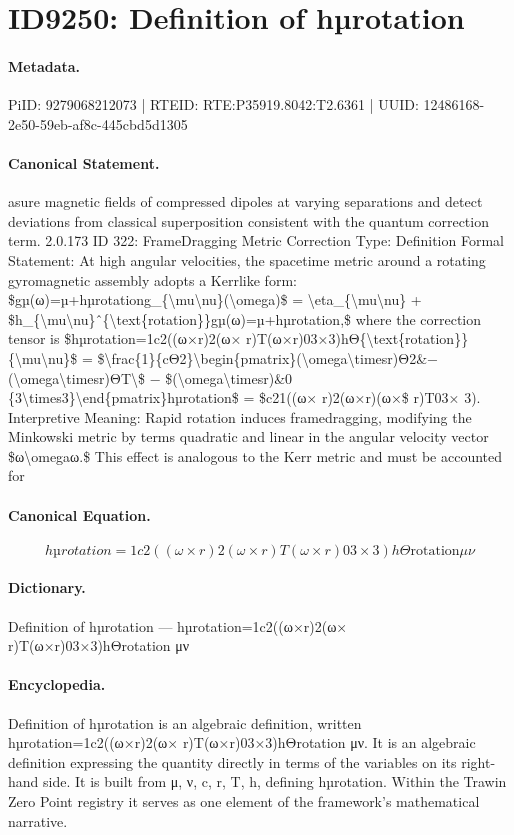 \section*{ID9250: Definition of hµrotation}
\paragraph{Metadata.}
PiID: 9279068212073 | RTEID: RTE:P35919.8042:T2.6361 | UUID: 12486168-2e50-59eb-af8c-445cbd5d1305

\paragraph{Canonical Statement.}
asure magnetic fields of compressed dipoles at varying separations and detect deviations from classical superposition consistent with the quantum correction term. 2.0.173 ID 322: FrameDragging Metric Correction Type: Definition Formal Statement: At high angular velocities, the spacetime metric around a rotating gyromagnetic assembly adopts a Kerrlike form: \$gµ(ω)=µ+hµrotationg\_\{\textbackslash{}mu\textbackslash{}nu\}(\textbackslash{}omega)\$ = \textbackslash{}eta\_\{\textbackslash{}mu\textbackslash{}nu\} + \$h\_\{\textbackslash{}mu\textbackslash{}nu\}ˆ\{\textbackslash{}text\{rotation\}\}gµ(ω)=µ+hµrotation,\$ where the correction tensor is \$hµrotation=1c2((ω×r)2(ω× r)T(ω×r)03×3)hΘ\{\textbackslash{}text\{rotation\}\} \{\textbackslash{}mu\textbackslash{}nu\}\$ = \$\textbackslash{}frac\{1\}\{cΘ2\}\textbackslash{}begin\{pmatrix\}(\textbackslash{}omega\textbackslash{}timesr)Θ2\&− (\textbackslash{}omega\textbackslash{}timesr)ΘT\textbackslash{}\$ − \$(\textbackslash{}omega\textbackslash{}timesr)\&0 \{3\textbackslash{}times3\}\textbackslash{}end\{pmatrix\}hµrotation\$ = \$c21((ω× r)2(ω×r)(ω×\$ r)T03× 3). Interpretive Meaning: Rapid rotation induces framedragging, modifying the Minkowski metric by terms quadratic and linear in the angular velocity vector \$ω\textbackslash{}omegaω.\$ This effect is analogous to the Kerr metric and must be accounted for

\paragraph{Canonical Equation.}
\[
hµrotation=1c2((ω×r)2(ω× r)T(ω×r)03×3)hΘ{\text{rotation}} {\mu\nu}
\]

\paragraph{Dictionary.}
Definition of hµrotation — hµrotation=1c2((ω×r)2(ω× r)T(ω×r)03×3)hΘrotation μν

\paragraph{Encyclopedia.}
Definition of hµrotation is an algebraic definition, written hµrotation=1c2((ω×r)2(ω× r)T(ω×r)03×3)hΘrotation μν. It is an algebraic definition expressing the quantity directly in terms of the variables on its right-hand side. It is built from μ, ν, c, r, T, h, defining hµrotation. Within the Trawin Zero Point registry it serves as one element of the framework's mathematical narrative.
